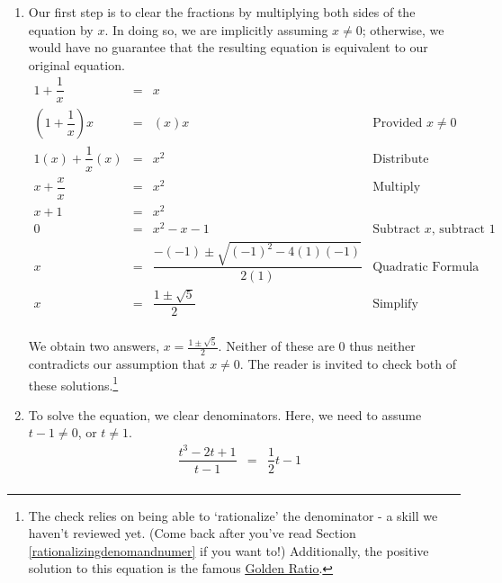 \begin{ex}
\begin{enumerate}
\item   Our first step is to clear the fractions by multiplying both sides of the equation by $x$. In doing so, we are implicitly assuming $x \neq 0$; otherwise, we would have no guarantee that the resulting equation is equivalent to our original equation.\[ \begin{array}{rclr}

1 + \dfrac{1}{x} & = & x & \\ [8pt]

\left(1 + \dfrac{1}{x}\right) x & = & (x)x & \text{Provided $x \neq 0$} \\ [10pt]


1(x) + \dfrac{1}{x} (x) & = & x^2 & \text{Distribute} \\ [8pt]

x + \dfrac{x}{x} & = & x^2 & \text{Multiply} \\ [8pt]

x + 1 & = & x^2 &  \\

0 & = & x^2 - x - 1 & \text{Subtract $x$, subtract $1$} \\ [5pt]

x & = & \dfrac{-(-1) \pm \sqrt{(-1)^2 - 4(1)(-1)}}{2(1)} & \text{Quadratic Formula} \\

x & = & \dfrac{1 \pm \sqrt{5}}{2} & \text{Simplify} \\

\end{array}\]

We obtain two answers, $x = \frac{1 \pm \sqrt{5}}{2}$.  Neither of these are $0$ thus neither contradicts our assumption that $x \neq 0$.  The reader is invited to check both of these solutions.\footnote{The check relies on being able to `rationalize' the denominator  - a skill we haven't reviewed yet. (Come back after you've read Section \ref{rationalizingdenomandnumer} if you want to!)  Additionally, the positive solution to this equation is the famous \href{http://en.wikipedia.org/wiki/Golden_ratio}{\underline{Golden Ratio}}.}

\item  To solve the equation, we clear denominators.  Here, we need to assume $t-1 \neq 0$, or $t \neq 1$.\[ \begin{array}{rclr}

\dfrac{t^3-2t+1}{t-1} & = & \dfrac{1}{2}t-1 & \\ [8pt]


\end{array}\]
\end{enumerate}
\end{ex}
